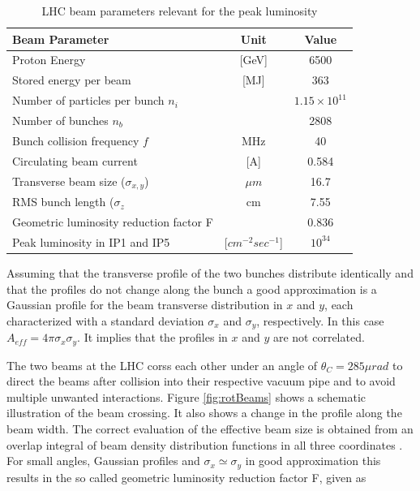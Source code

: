 \begin{table}[htp]
\begin{center}
\begin{tabular}{|l|c|c|}
\hline
{\bf Beam Parameter} & {\bf Unit} & {\bf Value} \\ \hline
Proton Energy & [GeV] & 6500 \\ \hline
Stored energy per beam & [MJ] & 363 \\ \hline
Number of particles per bunch $n_{i}$ & & $1.15 \times 10^{11}$ \\ \hline
Number of bunches $n_{b}$ & & 2808 \\ \hline
Bunch collision frequency $f$ & MHz & 40 \\ \hline
Circulating beam current & [A] & 0.584 \\ \hline
Transverse beam size ($\sigma_{x,y}$) & $\mu m$ & 16.7 \\ \hline
RMS bunch length ($\sigma_{z}$ & cm & 7.55 \\ \hline
Geometric luminosity reduction factor F & & 0.836 \\ \hline
Peak luminosity in IP1 and IP5 & [$cm^{-2} sec^{-1}$] & $10^{34}$ \\ \hline \hline

\end{tabular}
\end{center}
    \captionsetup{format=hang}
     \caption{LHC beam parameters relevant for the peak luminosity \cite{fill-schemes}}
    \label{tbl:beamParam}
\end{table}%


Assuming that the transverse profile of the two bunches distribute identically and that the profiles do not change along the bunch a good approximation is a Gaussian profile for the beam transverse distribution in $x$ and $y$, each characterized with a standard deviation $\sigma_{x}$ and $\sigma_{y}$, respectively. In this case $A_{eff} = 4 \pi \sigma_{x} \sigma_{y}$. It implies that the profiles in $x$ and $y$ are not correlated.


The two beams at the LHC corss each other under an angle of $\theta_{C} = 285 \mu rad$ to direct the beams after collision into their respective vacuum pipe and to avoid multiple unwanted interactions. Figure \ref{fig:rotBeams} shows a schematic illustration of the beam crossing. It also shows a change in the profile along the beam width. The correct evaluation of the effective beam size is obtained from an overlap integral of beam density distribution functions in all three coordinates \cite{lumiConcepts}. For small angles, Gaussian profiles and $\sigma_{x} \simeq \sigma_{y}$ in good approximation this results in the so called geometric luminosity reduction factor F, given as


